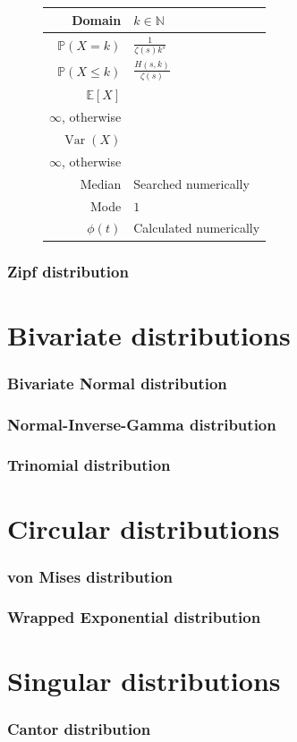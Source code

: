 \documentclass[a4paper,11pt]{article}
\theoremstyle{plain}
\theoremstyle{definition}
\newcommand{\ME}{\mathbb{E}}
\newcommand{\MP}{\mathbb{P}}
\newcommand{\MN}{\mathbb{N}}
\newcommand{\Var}{\operatorname{Var}}
\begin{document}
\begin{figure}[!htb]
\begin{minipage}{0.4\textwidth}
\begin{tabular}{| r | l |}
					Domain & $ k \in \MN $  \\
					\hline
					$\MP(X = k)$ & $ \frac{1}{\zeta(s) k^s} $ \\
					\hline
					$\MP(X \leq k)$ & $ \frac{H(s, k)}{\zeta(s)} $ \\
					\hline
					$\ME[X]$ & \pbox{\linewidth}{$ \frac{\zeta(s-1)}{\zeta(s)}$, $s > 2$ \\ $\infty$, otherwise } \\
					\hline
					$\Var(X)$ & \pbox{\linewidth}{$ \frac{\zeta(s-2)}{\zeta(s)} - (\ME[X])^2$, $\rho > 3$ \\ $\infty$, otherwise } \\
					\hline
					Median & Searched numerically \\
					\hline
					Mode & $1 $ \\
					\hline
					$\phi(t)$ & Calculated numerically \\
					\hline
				\end{tabular}
			\end{minipage}
		\end{figure}
		
	\pagebreak
	\section{Zipf distribution}
	
	\pagebreak
	\part{Bivariate distributions}
	\section{Bivariate Normal distribution}
	\section{Normal-Inverse-Gamma distribution}
	\section{Trinomial distribution}
	
	\pagebreak
	\part{Circular distributions}
	\section{von Mises distribution}
	\section{Wrapped Exponential distribution}
	
	\pagebreak
	\part{Singular distributions}
	\section{Cantor distribution}
	
\end{document}
